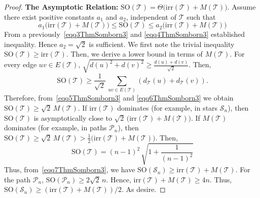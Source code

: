 \documentclass[10pt,a4paper]{amsart}
\newcommand{\SO}{\mathrm{SO}}
\newcommand{\TT}{\mathcal{T}}
\newcommand{\irr}{\mathrm{irr}}
\begin{document}
\begin{proof}
\vspace{0.3 cm}
\noindent\textbf{The Asymptotic Relation:} $\SO(\TT)=\Theta\!\bigl(\irr(\TT)+M(\TT)\bigr)$. Assume there exist positive constants $a_1$ and $a_2$, independent of $\TT$ such that
\begin{equation}~\label{eqq5ThmSomborn3}
a_1 \bigl(\irr(\TT)+M(\TT)\bigr) \leqslant \SO(\TT) \leqslant a_2 \bigl(\irr(\TT)+M(\TT)\bigr)
\end{equation}
From a previously~\eqref{eqq3ThmSomborn3} and \eqref{eqq4ThmSomborn3} established inequality. 
Hence $a_2=\sqrt{2}$ is sufficient. We first note the trivial inequality $\SO(\TT) \geqslant \irr(\TT)$.
Then, we derive a lower bound in terms of $M(\TT)$. For every edge $uv \in E(\TT)$, $\sqrt{d(u)^2+d(v)^2}\geqslant \frac{d(u)+d(v)}{\sqrt{2}}$. Then, 
\begin{equation}~\label{eqq6ThmSomborn3}
\SO(\TT)\geqslant \frac{1}{\sqrt{2}}\,\sum_{uv\in E(\TT)}(d_\TT(u)+d_\TT(v)).
\end{equation}
Therefore, from~\eqref{eqq5ThmSomborn3} and \eqref{eqq6ThmSomborn3} we obtain 
$\SO(\TT)\geqslant \sqrt{2}\,M(\TT)$. 
If $\irr(\TT)$ dominates (for example, in stars $\mathcal{S}_n$), then $\SO(\TT)$ is asymptotically close to $\sqrt{2}\,\bigl(\irr(\TT)+M(\TT)\bigr)$. If $M(\TT)$ dominates (for example, in paths $\mathcal{P}_n$), then $\SO(\TT) \geqslant\sqrt{2}\, M(\TT)>\frac{1}{2} \bigl(\irr(\TT)+M(\TT)\bigr)$. Then, 
\begin{equation}~\label{eqq7ThmSomborn3}
\SO(\TT)=(n-1)^2\,\sqrt{1+\frac{1}{(n-1)^2}}
\end{equation}
Thus, from~\eqref{eqq7ThmSomborn3}, we have  $\SO(\mathcal{S}_n)\geqslant \irr(\TT)+M(\TT)$.
For the path $\mathcal{P}_n$, $\SO(\mathcal{P}_n)\geqslant 2\sqrt{2}\,n$.
Hence,  $\irr(\TT)+M(\TT)\geqslant 4n$. Thus, $\SO(\mathcal{S}_n)\geqslant \left(\irr(\TT)+M(\TT)\right)/2$. As desire.
\end{proof}
\end{document}
